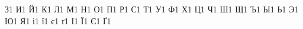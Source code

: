{    {З}{{\selectfont{}}}1
    {И}{{\selectfont{}}}1
    {Й}{{\selectfont{}}}1
    {К}{{\selectfont{}}}1
    {Л}{{\selectfont{}}}1
    {М}{{\selectfont{}}}1
    {Н}{{\selectfont{}}}1
    {О}{{\selectfont{}}}1
    {П}{{\selectfont{}}}1
    {Р}{{\selectfont{}}}1
    {С}{{\selectfont{}}}1
    {Т}{{\selectfont{}}}1
    {У}{{\selectfont{}}}1
    {Ф}{{\selectfont{}}}1
    {Х}{{\selectfont{}}}1
    {Ц}{{\selectfont{}}}1
    {Ч}{{\selectfont{}}}1
    {Ш}{{\selectfont{}}}1
    {Щ}{{\selectfont{}}}1
    {Ъ}{{\selectfont{}}}1
    {Ы}{{\selectfont{}}}1
    {Ь}{{\selectfont{}}}1
    {Э}{{\selectfont{}}}1
    {Ю}{{\selectfont{}}}1
    {Я}{{\selectfont{}}}1
    {і}{{\selectfont{}}}1
    {ї}{{\selectfont{}}}1
    {є}{{\selectfont{}}}1
    {ґ}{{\selectfont{}}}1
    {І}{{\selectfont{}}}1
    {Ї}{{\selectfont{}}}1
    {Є}{{\selectfont{}}}1
    {Ґ}{{\selectfont{}}}1
}
